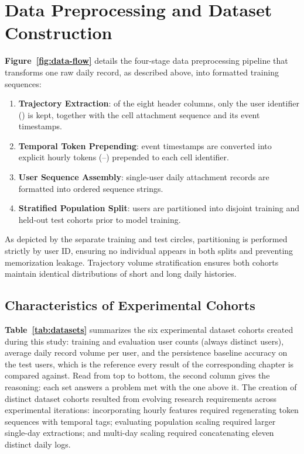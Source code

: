 \section{Data Preprocessing and Dataset Construction}
\label{sec:data-sets}

\textbf{Figure~\ref{fig:data-flow}} details the four-stage data preprocessing pipeline that transforms one raw daily record, as described above, into formatted training sequences:
\begin{enumerate}
  \item \textbf{Trajectory Extraction}: of the eight header columns, only the user identifier () is kept, together with the cell attachment sequence and its event timestamps.
  \item \textbf{Temporal Token Prepending}: event timestamps are converted into explicit hourly tokens (--) prepended to each cell identifier.
  \item \textbf{User Sequence Assembly}: single-user daily attachment records are formatted into ordered sequence strings.
  \item \textbf{Stratified Population Split}: users are partitioned into disjoint training and held-out test cohorts prior to model training.
\end{enumerate}
As depicted by the separate training and test circles, partitioning is performed strictly by user ID, ensuring no individual appears in both splits and preventing memorization leakage. Trajectory volume stratification ensures both cohorts maintain identical distributions of short and long daily histories.



\subsection{Characteristics of Experimental Cohorts}

\textbf{Table~\ref{tab:datasets}} summarizes the six experimental dataset cohorts created during this study: training and evaluation user counts (always distinct users), average daily record volume per user, and the persistence baseline accuracy on the test users, which is the reference every result of the corresponding chapter is compared against. Read from top to bottom, the second column gives the reasoning: each set answers a problem met with the one above it. The creation of distinct dataset cohorts resulted from evolving research requirements across experimental iterations: incorporating hourly features required regenerating token sequences with temporal tags; evaluating population scaling required larger single-day extractions; and multi-day scaling required concatenating eleven distinct daily logs.

